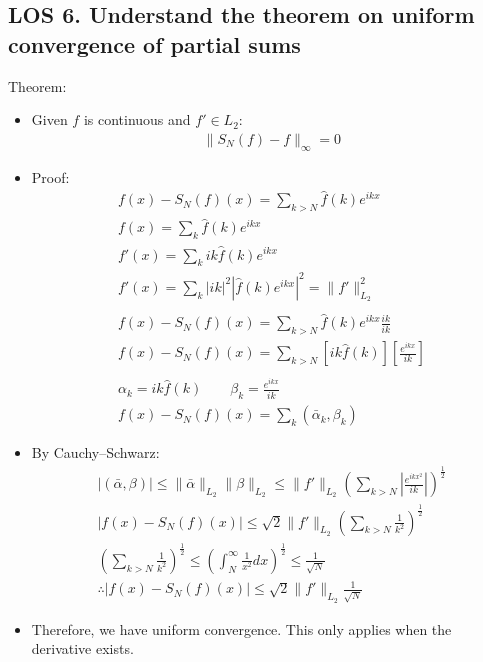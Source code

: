 \documentclass[12pt, a4paper]{article}
\begin{document}
\subsection*{LOS 6. Understand the theorem on uniform convergence of partial sums}
Theorem:
\begin{itemize}
    \item Given $f$ is continuous and $f' \in L_2$:
    \begin{gather*}
        \|S_N(f)-f\|_\infty = 0
    \end{gather*}
    \item Proof:
    \begin{gather*}
        f(x) - S_N(f)(x) = \sum_{k > N} \hat{f}(k)e^{ikx}\\
        f(x) = \sum_k \hat{f}(k)e^{ikx}\\
        f'(x) = \sum_k ik\hat{f}(k)e^{ikx}\\
        f'(x) = \sum_k |ik|^2|\hat{f}(k)e^{ikx}|^2 = \|f'\|^2_{L_2}\\\\
        f(x) - S_N(f)(x) = \sum_{k > N} \hat{f}(k)e^{ikx} \frac{ik}{ik}\\
        f(x) - S_N(f)(x) = \sum_{k > N} \left[ik\hat{f}(k)\right] \left[\frac{e^{ikx}}{ik}\right]\\\\
        \alpha_k = ik\hat{f}(k) \qquad \beta_k = \frac{e^{ikx}}{ik}\\
        f(x) - S_N(f)(x) = \sum_k (\bar{\alpha}_k, \beta_k)
    \end{gather*}
    \item By Cauchy–Schwarz:
    \begin{gather*}
        |(\bar{\alpha}, \beta)| \leq \|\bar{\alpha}\|_{L_2}\|\beta\|_{L_2}  \leq \|f'\|_{L_2}\left(\sum_{k > N} \left|\frac{e^{ikx^2}}{ik}\right|\right)^\frac{1}{2}\\
        |f(x) - S_N(f)(x)| \leq \sqrt{2}\|f'\|_{L_2}\left(\sum_{k > N}\frac{1}{k^2}\right)^\frac{1}{2}\\
        \left(\sum_{k > N}\frac{1}{k^2}\right)^\frac{1}{2} \leq \left(\int_N^\infty\frac{1}{x^2}dx\right)^\frac{1}{2} \leq \frac{1}{\sqrt{N}}\\
        \therefore |f(x) - S_N(f)(x)| \leq \sqrt{2}\|f'\|_{L_2}\frac{1}{\sqrt{N}}
    \end{gather*}
    \item Therefore, we have uniform convergence. This only applies when the derivative exists.
\end{itemize}
\vspace{0.3em}
\end{document}
